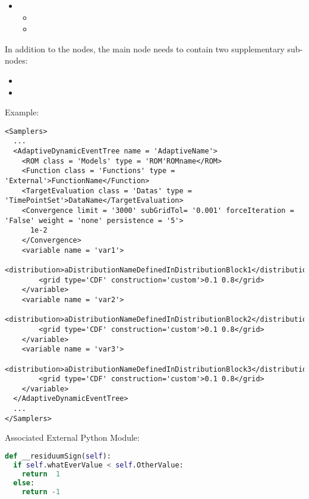 \begin{itemize}
\item \variableDescription
  \variableChildrenIntro
 \begin{itemize}
    \item \distributionDescription
    \item \gridDescription
  \end{itemize}
\end{itemize}

 In addition to the  nodes, the main
 node needs to contain two supplementary
sub-nodes:

\begin{itemize}
  \item \convergenceDescription
  \item \assemblerDescription
\end{itemize}


Example:
\begin{lstlisting}[style=XML]
<Samplers>
  ...
  <AdaptiveDynamicEventTree name = 'AdaptiveName'>
    <ROM class = 'Models' type = 'ROM'ROMname</ROM>
    <Function class = 'Functions' type = 'External'>FunctionName</Function>
    <TargetEvaluation class = 'Datas' type = 'TimePointSet'>DataName</TargetEvaluation>
    <Convergence limit = '3000' subGridTol= '0.001' forceIteration = 'False' weight = 'none' persistence = '5'>
      1e-2
    </Convergence>
    <variable name = 'var1'>
        <distribution>aDistributionNameDefinedInDistributionBlock1</distribution> 
        <grid type='CDF' construction='custom'>0.1 0.8</grid>
    </variable>
    <variable name = 'var2'>
        <distribution>aDistributionNameDefinedInDistributionBlock2</distribution> 
        <grid type='CDF' construction='custom'>0.1 0.8</grid>
    </variable>
    <variable name = 'var3'>
        <distribution>aDistributionNameDefinedInDistributionBlock3</distribution> 
        <grid type='CDF' construction='custom'>0.1 0.8</grid>
    </variable>
  </AdaptiveDynamicEventTree>
  ...
</Samplers>
\end{lstlisting}

Associated External Python Module:
\begin{lstlisting}[language=python]
def __residuumSign(self):
  if self.whatEverValue < self.OtherValue:
    return  1
  else:
    return -1
\end{lstlisting} 
